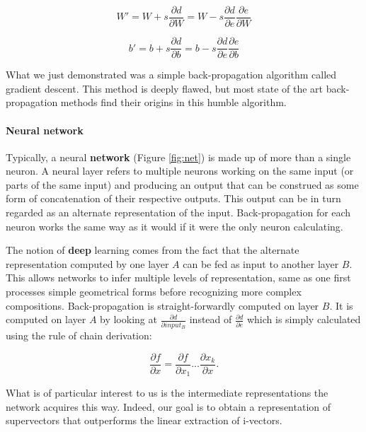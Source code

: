 \documentclass[conference]{IEEEtran}
\begin{document}
\begin{equation}
  W'=W + s\frac{\partial d}{\partial W}=W-s\frac{\partial d}{\partial e}\frac{\partial e}{\partial W}
  \label{eq:W}
\end{equation}

\begin{equation}
  b'=b + s\frac{\partial d}{\partial b}=b-s\frac{\partial d}{\partial e}\frac{\partial e}{\partial b}
  \label{eq:b}
\end{equation}

What we just demonstrated was a simple back-propagation algorithm called gradient
descent. This method is deeply flawed, but most state of the art back-propagation
methods find their origins in this humble algorithm.

\paragraph{Neural network}

Typically, a neural \textbf{network} (Figure \ref{fig:net}) is made up of more than a single neuron. A
neural layer refers to multiple neurons working on the same input (or parts of
the same input) and producing an output that can be construed as some form of
concatenation of their respective outputs. This output can be in turn regarded
as an alternate representation of the input. Back-propagation for each neuron
works the same way as it would if it were the only neuron calculating.

The notion of \textbf{deep} learning comes from the fact that the alternate
representation computed by one layer $A$ can be fed as input to another layer $B$.
This allows networks to infer multiple levels of representation, same as one
first processes simple geometrical forms before recognizing more complex
compositions. Back-propagation is straight-forwardly computed on layer $B$. It is
computed on layer $A$ by looking at $\frac{\partial d}{\partial input_B}$
instead of $\frac{\partial d}{\partial e}$ which is simply calculated using the
rule of chain derivation:

\begin{equation}
  \frac{\partial f}{\partial x}=\frac{\partial f}{\partial x_1}...\frac{\partial x_k}{\partial x}.
\end{equation}

What is of particular interest to us is the intermediate representations the
network acquires this way. Indeed, our goal is to obtain a representation of
supervectors that outperforms the linear extraction of i-vectors.
\end{document}
